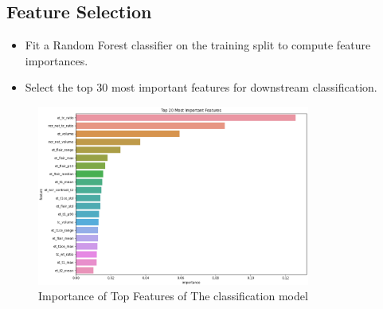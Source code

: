 \subsection{Feature Selection}
\begin{itemize}
  \item Fit a Random Forest classifier on the training split to compute feature importances.
  \item Select the top 30 most important features for downstream classification.
\end{itemize}

\begin{figure}[H]
  \centering
  \includegraphics[width=0.8\textwidth]{Images/Chapter3/features.png}
  \caption{Importance of Top Features of The classification model}
  \label{fig:features}
\end{figure}


